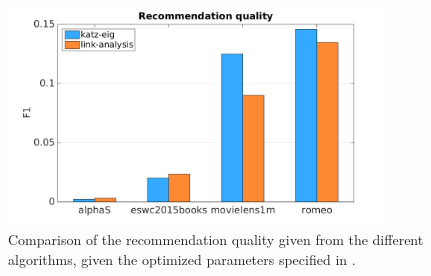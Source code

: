 \begin{figure}[h!]
    \centering
    \includegraphics[width=0.9\textwidth]{fig/comp/comp_rec_quality.png}
    \caption{Comparison of the recommendation quality given from the different algorithms, given the optimized parameters specified in .}
\end{figure}

